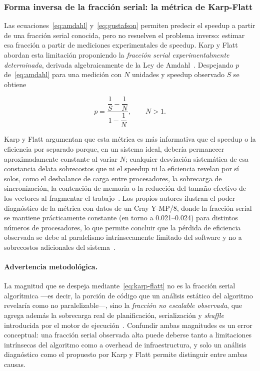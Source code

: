 \documentclass[11pt,a4paper]{article}
\begin{document}
    \subsubsection{Forma inversa de la fracción serial: la métrica de Karp-Flatt}

    Las ecuaciones~\eqref{eq:amdahl} y~\eqref{eq:gustafson} permiten
    predecir el speedup a partir de una fracción serial conocida, pero no
    resuelven el problema inverso: estimar esa fracción a partir de
    mediciones experimentales de speedup. Karp y Flatt abordan esta
    limitación proponiendo la \emph{fracción serial experimentalmente
    determinada}, derivada algebraicamente de la Ley de
    Amdahl~\autocite{karpflatt1990}. Despejando $p$ de~\eqref{eq:amdahl} para
    una medición con $N$ unidades y speedup observado $S$ se obtiene

    \begin{equation}
        p = \frac{\dfrac{1}{S} - \dfrac{1}{N}}{1 - \dfrac{1}{N}}, \qquad N > 1.
        \label{eq:karp-flatt}
    \end{equation}

    Karp y Flatt argumentan que esta métrica es más informativa que el
    speedup o la eficiencia por separado porque, en un sistema ideal, debería
    permanecer aproximadamente constante al variar $N$; cualquier desviación
    sistemática de esa constancia delata sobrecostos que ni el speedup ni
    la eficiencia revelan por sí solos, como el desbalance de
    carga entre procesadores, la sobrecarga de sincronización, la
    contención de memoria o la reducción del tamaño efectivo de los
    vectores al fragmentar el trabajo~\autocite{karpflatt1990}. Los propios
    autores ilustran el poder diagnóstico de la métrica con datos de un
    Cray Y-MP/8, donde la fracción serial se mantiene prácticamente
    constante (en torno a 0.021--0.024) para distintos números de
    procesadores, lo que permite concluir que la pérdida de eficiencia
    observada se debe al paralelismo intrínsecamente limitado del
    software y no a sobrecostos adicionales del
    sistema~\autocite{karpflatt1990}.

    \paragraph{Advertencia metodológica.} La magnitud que se despeja
    mediante~\eqref{eq:karp-flatt} no es la fracción serial algorítmica
    —es decir, la porción de código que un análisis estático del
    algoritmo revelaría como no paralelizable—, sino la \emph{fracción no
    escalable observada}, que agrega además la sobrecarga real de
    planificación, serialización y \emph{shuffle} introducida por el
    motor de ejecución~\autocite{karpflatt1990}. Confundir ambas magnitudes es
    un error conceptual: una fracción serial observada alta puede deberse
    tanto a limitaciones intrínsecas del algoritmo como a overhead de
    infraestructura, y solo un análisis diagnóstico como el propuesto por
    Karp y Flatt permite distinguir entre ambas causas.
\end{document}
